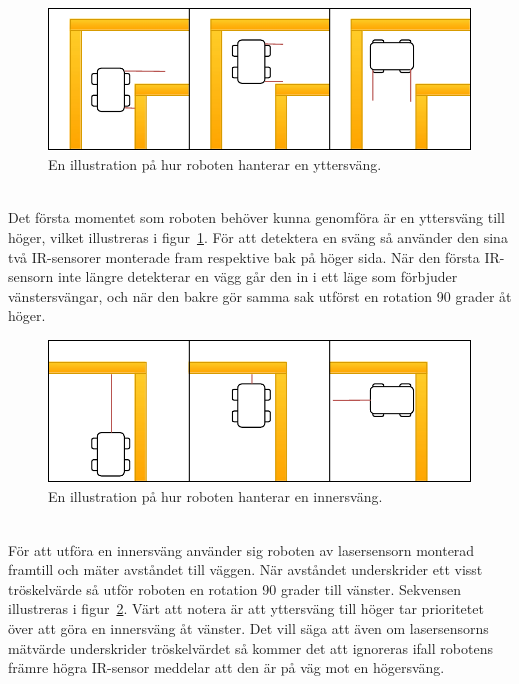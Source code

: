 \documentclass{article}
\begin{document}
\begin{figure}[H]
\centering
\includegraphics[scale=0.6]{navigation_outer_turn}
\caption{En illustration på hur roboten hanterar en yttersväng.}
\label{fig:navigation_outer_turn}
\end{figure}
\ \\
\newline
Det första momentet som roboten behöver kunna genomföra är en yttersväng till höger, vilket illustreras i figur~\ref{fig:navigation_outer_turn}. För att detektera en sväng så använder den sina två IR-sensorer monterade fram respektive bak på höger sida. När den första IR-sensorn inte längre detekterar en vägg går den in i ett läge som förbjuder vänstersvängar, och när den bakre gör samma sak utförst en rotation 90 grader åt höger.

\begin{figure}[H]
\centering
\includegraphics[scale=0.6]{navigation_inner_turn}
\caption{En illustration på hur roboten hanterar en innersväng.}
\label{fig:navigation_inner_turn}
\end{figure}
\ \\
\newline
För att utföra en innersväng använder sig roboten av lasersensorn monterad framtill och mäter avståndet till väggen. När avståndet underskrider ett visst tröskelvärde så utför roboten en rotation 90 grader till vänster. Sekvensen illustreras i figur~\ref{fig:navigation_inner_turn}. Värt att notera är att yttersväng till höger tar prioritetet över att göra en innersväng åt vänster. Det vill säga att även om lasersensorns mätvärde underskrider tröskelvärdet så kommer det att ignoreras ifall robotens främre högra IR-sensor meddelar att den är på väg mot en högersväng.
\end{document}
